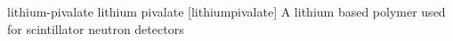 \newglsXchemical%
{lithium-pivalate}%
{lithium pivalate}%
{}%
[lithiumpivalate]%
{A lithium based polymer used for scintillator neutron detectors}%